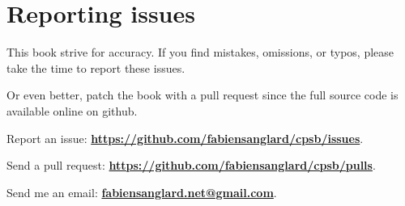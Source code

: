 \chapter*{Reporting issues}
This book strive for accuracy. If you find mistakes, omissions, or typos, please take the time to report these issues. 

Or even better, patch the book with a pull request since the full source code is available online on github.


Report an issue: \textbf{\href{https://github.com/fabiensanglard/cpsb/issues}{https://github.com/fabiensanglard/cpsb/issues}}.

Send a pull request: \textbf{\href{https://github.com/fabiensanglard/cpsb/pulls}{https://github.com/fabiensanglard/cpsb/pulls}}.

Send me an email: \textbf{\href{mailto:fabiensanglard.net@gmail.com}{fabiensanglard.net@gmail.com}}.
